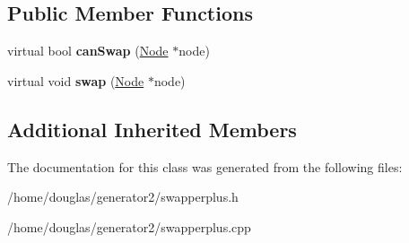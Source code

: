 \subsection*{Public Member Functions}
\begin{DoxyCompactItemize}
\item 
virtual bool {\bfseries can\+Swap} (\hyperlink{classNode}{Node} $\ast$node)\hypertarget{classSwapperPlus_a827dd0ad5d25df7c4eca350d9d92fe50}{}\label{classSwapperPlus_a827dd0ad5d25df7c4eca350d9d92fe50}

\item 
virtual void {\bfseries swap} (\hyperlink{classNode}{Node} $\ast$node)\hypertarget{classSwapperPlus_ae5124c7b4793158d2fa5aba1cdf89c54}{}\label{classSwapperPlus_ae5124c7b4793158d2fa5aba1cdf89c54}

\end{DoxyCompactItemize}
\subsection*{Additional Inherited Members}


The documentation for this class was generated from the following files\+:\begin{DoxyCompactItemize}
\item 
/home/douglas/generator2/swapperplus.\+h\item 
/home/douglas/generator2/swapperplus.\+cpp\end{DoxyCompactItemize}
